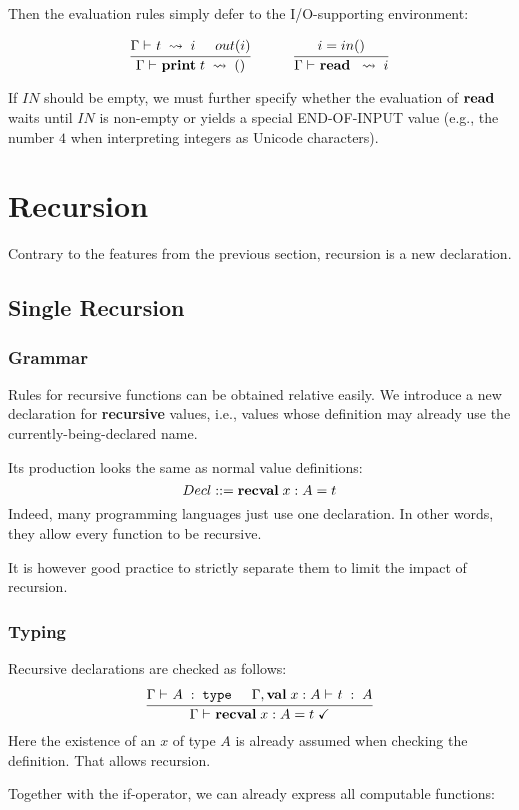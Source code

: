 Then the evaluation rules simply defer to the I/O-supporting environment:

\[\rul{\evobj{}{\Gamma}{t}{i} \tb out(i)}
      {\evobj{}{\Gamma}{\aprint{t}}{()}}
\tb\tb
\rul{i=in()}
    {\evobj{}{\Gamma}{\aread}{i}}
\]

If $IN$ should be empty, we must further specify whether the evaluation of $\aread$ waits until $IN$ is non-empty or yields a special END-OF-INPUT value (e.g., the number $4$ when interpreting integers as Unicode characters).


\section{Recursion}

Contrary to the features from the previous section, recursion is a new declaration.

\subsection{Single Recursion}

\subsubsection{Grammar}

Rules for recursive functions can be obtained relative easily.
We introduce a new declaration for \textbf{recursive} values, i.e., values whose definition may already use the currently-being-declared name.

Its production looks the same as normal value definitions:
\[Decl ::= {\rm \bf recval}\; x:A=t\]
Indeed, many programming languages just use one declaration.
In other words, they allow every function to be recursive.

It is however good practice to strictly separate them to limit the impact of recursion.

\subsubsection{Typing}

Recursive declarations are checked as follows:
\[\rul{\oftype{}{\Gamma}{A}{\type} \tb \oftype{}{\Gamma,\aval{x}{A}{}}{t}{A}}
      {\isdecl{}{\Gamma}{\arecval{x}{A}{t}}}
\]
Here the existence of an $x$ of type $A$ is already assumed when checking the definition.
That allows recursion.

Together with the if-operator, we can already express all computable functions:

